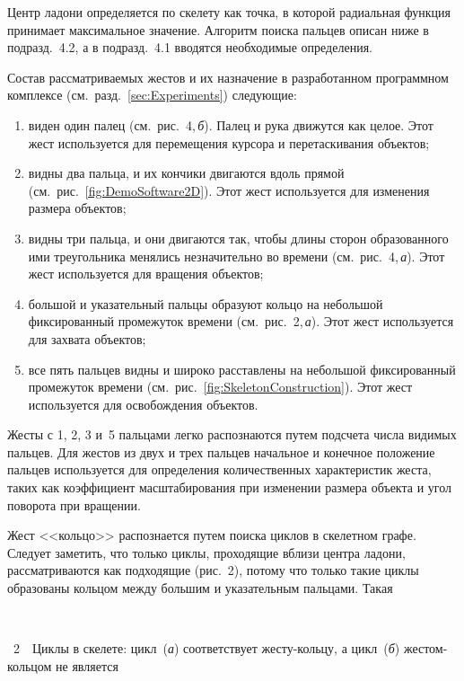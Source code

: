 \begin{multicols}{2}
\smallskip

Центр ладони определяется по скелету как точка, в которой радиальная 
функция принимает максимальное значение.
Алгоритм поиска пальцев описан ниже в подразд.~4.2,
а в подразд.~4.1 вводятся необходимые определения.

Состав рассматриваемых жестов и их назначение в разработанном программном комплексе 
(см.\ разд.~\ref{sec:Experiments}) следующие:
\begin{enumerate}[(1)]
\item виден один палец (см.\ рис.~4,\,\textit{б}). 
Палец и рука движутся как целое. Этот жест используется для перемещения 
курсора и перетаскивания объектов;
\item видны два пальца, и их кончики двигаются вдоль прямой (см.\ рис.~\ref{fig:DemoSoftware2D}). 
Этот жест используется для изменения размера объектов;
\item видны три пальца, и они двигаются так, чтобы длины 
сторон образованного ими треугольника менялись незначительно во времени 
(см.\ рис.~4,\,\textit{а}). 
Этот жест используется для вращения объектов;
\item большой и указательный пальцы образуют кольцо на небольшой фиксированный промежуток 
времени (см.\ рис.~2,\,\textit{а}).
    Этот жест используется для захвата объектов;
\item все пять пальцев видны и широко расставлены на 
небольшой фиксированный промежуток времени (см.\ рис.~\ref{fig:SkeletonConstruction}).
    Этот жест используется для освобождения объектов.
\end{enumerate}





Жесты с 1, 2, 3 и~5 пальцами легко распознаются путем подсчета числа видимых пальцев.
Для жестов из двух и трех пальцев начальное и конечное положение пальцев используется 
для определения количественных характеристик жеста,
таких как коэффициент масштабирования при изменении 
размера объекта и угол поворота при вращении.

Жест <<кольцо>> распознается путем поиска цик\-лов в скелетном графе.
Следует заметить, что только циклы, проходящие вблизи центра ладони, 
рас\-смат\-ри\-ва\-ют\-ся как подходящие (рис.~2),
потому что только такие циклы образованы кольцом между большим и указательным пальцами.
Такая\linebreak\vspace*{-12pt}
\begin{center} %
\vspace*{1pt}
\mbox{%
 \epsfxsize=78.046mm
}
\end{center}
\vspace*{1pt}
{{\figurename~2}\ \ \small{Циклы в скелете: цикл~(\textit{а}) соответствует жес\-ту-коль\-цу, 
  а цикл~(\textit{б}) жес\-том-коль\-цом не является
}}
\vspace*{9pt}


\end{multicols}
